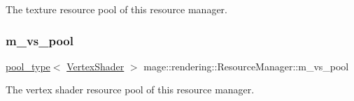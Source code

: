 The texture resource pool of this resource manager. \mbox{\label{classmage_1_1rendering_1_1_resource_manager_ac4af09e51fbbcfb534edb72d98033979}} 
\subsubsection{\texorpdfstring{m\+\_\+vs\+\_\+pool}{m\_vs\_pool}}
{\footnotesize\ttfamily \mbox{\hyperlink{classmage_1_1rendering_1_1_resource_manager_ab21a4e280087032ee533f267bd9bf602}{pool\+\_\+type}}$<$ \mbox{\hyperlink{classmage_1_1rendering_1_1_vertex_shader}{Vertex\+Shader}} $>$ mage\+::rendering\+::\+Resource\+Manager\+::m\+\_\+vs\+\_\+pool\hspace{0.3cm}{\ttfamily [private]}}

The vertex shader resource pool of this resource manager. 